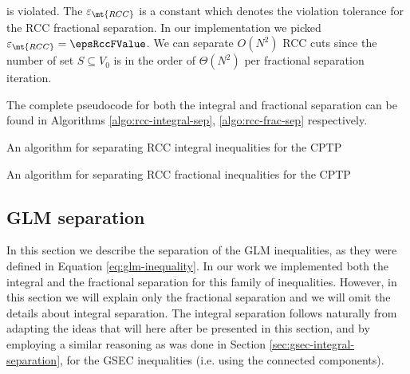 is violated.
The $\varepsilon_{\mt{RCC}}$ is a constant which denotes the violation tolerance for the RCC fractional separation.
In our implementation we picked $\varepsilon_{\mt{RCC}} = \epsRccFValue$.
We can separate $O(N^2)$ RCC cuts since the number of set $S \subseteq V_0$ is in the order of $\Theta(N^2)$ per fractional separation iteration.

The complete pseudocode for both the integral and fractional separation can be found in Algorithms \ref{algo:rcc-integral-sep}, \ref{algo:rcc-frac-sep} respectively.

\begin{algorithm}
	\caption{An algorithm for separating RCC integral inequalities for the CPTP}
	\label{algo:rcc-integral-sep}
	
\end{algorithm}

\begin{algorithm}
	\caption{An algorithm for separating RCC fractional inequalities for the CPTP}
	\label{algo:rcc-frac-sep}
	
\end{algorithm}

\subsection{GLM separation}
\label{sec:impl-glm-separation}

In this section we describe the separation of the GLM inequalities, as they were defined in Equation \eqref{eq:glm-inequality}.
In our work we implemented both the integral and the fractional separation for this family of inequalities.
However, in this section we will explain only the fractional separation and we will omit the details about integral separation.
The integral separation follows naturally from adapting the ideas that will here after be presented in this section, and by employing a similar reasoning as was done in Section \ref{sec:gsec-integral-separation}, for the GSEC inequalities (i.e. using the connected components).

